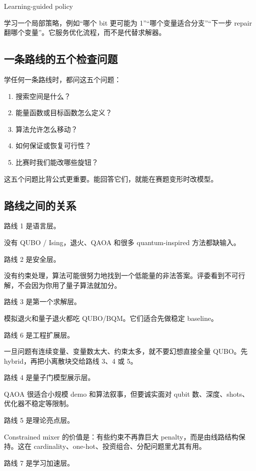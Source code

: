 \documentclass[UTF8,12pt,a4paper]{ctexart}
\begin{document}
Learning-guided policy

学习一个局部策略，例如“哪个 bit 更可能为 1”“哪个变量适合分支”“下一步 repair 翻哪个变量”。它服务优化流程，而不是代替求解器。

\subsection*{一条路线的五个检查问题}

学任何一条路线时，都问这五个问题：

\begin{enumerate}
\item 搜索空间是什么？
\item 能量函数或目标函数怎么定义？
\item 算法允许怎么移动？
\item 如何保证或恢复可行性？
\item 比赛时我们能改哪些旋钮？
\end{enumerate}

这五个问题比背公式更重要。能回答它们，就能在赛题变形时改模型。

\subsection*{路线之间的关系}

路线 1 是语言层。

没有 QUBO / Ising，退火、QAOA 和很多 quantum-inspired 方法都缺输入。

路线 2 是安全层。

没有约束处理，算法可能很努力地找到一个低能量的非法答案。评委看到不可行解，不会因为你用了量子算法就加分。

路线 3 是第一个求解层。

模拟退火和量子退火都吃 QUBO/BQM。它们适合先做稳定 baseline。

路线 6 是工程扩展层。

一旦问题有连续变量、变量数太大、约束太多，就不要幻想直接全量 QUBO。先 hybrid，再把小离散块交给路线 3、4 或 5。

路线 4 是量子门模型展示层。

QAOA 很适合小规模 demo 和算法叙事，但要诚实面对 qubit 数、深度、shots、优化器不稳定等限制。

路线 5 是理论亮点层。

Constrained mixer 的价值是：有些约束不再靠巨大 penalty，而是由线路结构保持。这在 cardinality、one-hot、投资组合、分配问题里尤其有用。

路线 7 是学习加速层。
\end{document}
